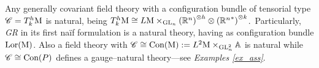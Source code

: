 \begin{example}
    
        Any generally covariant field theory with a configuration bundle of tensorial type $\mathscr{C}=T^h_k\text{\normalfont M}$ is natural, being $T^h_k\text{\normalfont M}\cong L\text{\normalfont M}\times_{\text{\normalfont GL}_n}\left(\mathbb{R}^n\right)^{\otimes h}\otimes\left({\mathbb{R}^n}^*\right)^{\otimes k}$.\, Particularly, \emph{GR} in its first naïf formulation is a natural theory, having as configuration bundle $\text{\normalfont Lor}(\text{\normalfont M})$. Also a field theory with $\mathscr{C}\cong\text{\normalfont Con}(\text{\normalfont M}):=L^2\text{\normalfont M}\times_{\text{\normalfont GL}_n^2}\mathbb{A}$ is natural while $\mathscr{C}\cong\text{\normalfont Con}(P)$ defines a gauge--natural theory---see \emph{Examples \ref{ex_ass}}.%

   
\end{example}


